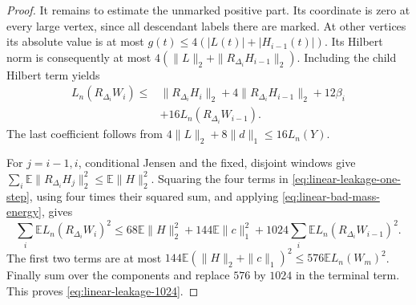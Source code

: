 \begin{proof}
It remains to estimate the unmarked positive part.  Its coordinate is
zero at every large vertex, since all descendant labels there are
marked.  At other vertices its absolute value is at most
\(g(t)\le4(|L(t)|+|H_{i-1}(t)|)\).  Its Hilbert norm is consequently
at most \(4(\|L\|_2+\|R_{\Delta_i}H_{i-1}\|_2)\).  Including the child
Hilbert term yields
\begin{equation}\label{eq:linear-leakage-one-step}
 \begin{split}
 L_n(R_{\Delta_i}W_i)\le{}&\|R_{\Delta_i}H_i\|_2
     +4\|R_{\Delta_i}H_{i-1}\|_2+12\beta_i\\
     &+16L_n(R_{\Delta_i}W_{i-1}).
 \end{split}
\end{equation}
The last coefficient follows from
\(4\|L\|_2+8\|d\|_1\le16L_n(Y)\).

For \(j=i-1,i\), conditional Jensen and the fixed, disjoint windows give
\(\sum_i\mathbb E\|R_{\Delta_i}H_j\|_2^2\le\mathbb E\|H\|_2^2\).
Squaring the four terms in \eqref{eq:linear-leakage-one-step}, using
four times their squared sum, and applying
\eqref{eq:linear-bad-mass-energy}, gives
\[
 \sum_i\mathbb E L_n(R_{\Delta_i}W_i)^2
 \le68\mathbb E\|H\|_2^2+144\mathbb E\|c\|_1^2
        +1024\sum_i\mathbb E L_n(R_{\Delta_i}W_{i-1})^2.
\]
The first two terms are at most
\(144\mathbb E(\|H\|_2+\|c\|_1)^2
 \le576\mathbb E L_n(W_m)^2\).
Finally sum over the components and replace \(576\) by \(1024\) in the
terminal term.  This proves \eqref{eq:linear-leakage-1024}.
\end{proof}
